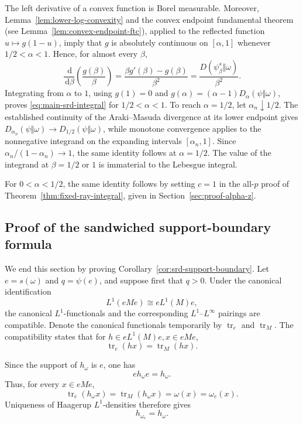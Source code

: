 \documentclass[12pt]{article}
\numberwithin{equation}{section}
\theoremstyle{definition}
\theoremstyle{remark}
\newcommand{\dd}{\,\mathrm d}
\newcommand{\?}{\overset{?}{=}}
\DeclareMathOperator{\tr}{tr}
\begin{document}
The left derivative of a convex function is Borel measurable.  Moreover,
Lemma~\ref{lem:lower-log-convexity} and the convex endpoint fundamental
theorem (see Lemma~\ref{lem:convex-endpoint-ftc}), applied to the reflected function $u\mapsto g(1-u)$, imply that
$g$ is absolutely continuous on $[\alpha,1]$ whenever
$1/2<\alpha<1$.  Hence, for almost every $\beta$,
\begin{equation}
  \frac{\dd}{\dd\beta}\left(\frac{g(\beta)}\beta\right)
  =\frac{\beta g'(\beta)-g(\beta)}{\beta^2}
  =\frac{D(\psi_\beta^s\Vert\omega)}{\beta^2}.
\end{equation}
Integrating from $\alpha$ to $1$, using $g(1)=0$ and
$g(\alpha)=(\alpha-1)D_\alpha(\psi\Vert\omega)$, proves
\eqref{eq:main-srd-integral} for $1/2<\alpha<1$.  To reach
$\alpha=1/2$, let $\alpha_n\downarrow1/2$.  The established continuity of
the Araki--Masuda divergence at its lower endpoint
\cite[Lemma~8]{Berta:2016vnw} gives
$D_{\alpha_n}(\psi\Vert\omega)\to D_{1/2}(\psi\Vert\omega)$, while
monotone convergence applies to the nonnegative integrand on the expanding
intervals $[\alpha_n,1]$.  Since
$\alpha_n/(1-\alpha_n)\to1$, the same identity follows at
$\alpha=1/2$.  The value of the integrand at $\beta=1/2$ or $1$ is
immaterial to the Lebesgue integral.

For $0<\alpha<1/2$, the same identity follows by setting $c=1$ in the
all-$p$ proof of Theorem~\ref{thm:fixed-ray-integral}, given in Section~\ref{sec:proof-alpha-z}.

\subsection{Proof of the sandwiched support-boundary formula}

We end this section by proving
Corollary~\ref{cor:srd-support-boundary}.
Let $e=s(\omega)$ and $q=\psi(e)$, and suppose first that $q>0$.
Under the canonical identification
\begin{equation}
  L^1(eMe)\cong eL^1(M)e,
  \label{eq:corner-L1-identification}
\end{equation}
the canonical $L^1$-functionals and the corresponding
$L^1$--$L^\infty$ pairings are compatible. 
Denote the canonical functionals
temporarily by $\tr_e$ and $\tr_M$. The compatibility states that for $h\in eL^1(M)e, x\in eMe$,
\begin{equation}
    \tr_e(hx) = \tr_M(hx).
\end{equation}

Since the support of $h_\omega$ is $e$, one has
\[
  e h_\omega e=h_\omega.
\]
Thus, for every $x\in eMe$,
\[
  \tr_e(h_\omega x)
  =
  \tr_M(h_\omega x)
  =
  \omega(x)
  =
  \omega_e(x).
\]
Uniqueness of Haagerup $L^1$-densities therefore gives
\[
  h_{\omega_e}=h_\omega.
\]
\end{document}
